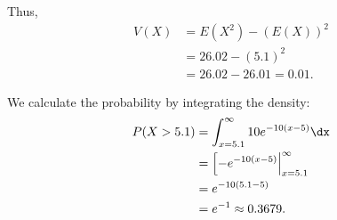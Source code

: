 {    Thus,
    \begin{align*}
    V(X)    &=E(X^2)-(E(X))^2\\
            &=26.02-(5.1)^2\\
            &=26.02-26.01 = 0.01.
    \end{align*}

    We calculate the probability by integrating the density:
    \begin{align*}
    P(X>5.1)    &=\int_{x=5.1}^\infty 10e^{-10(x-5)}\dx\\
                &=\left[-e^{-10(x-5)}\right|_{x=5.1}^{\infty}\\
                &=e^{-10(5.1-5)}\\
                &=e^{-1} \approx 0.3679.
    \end{align*}
}

